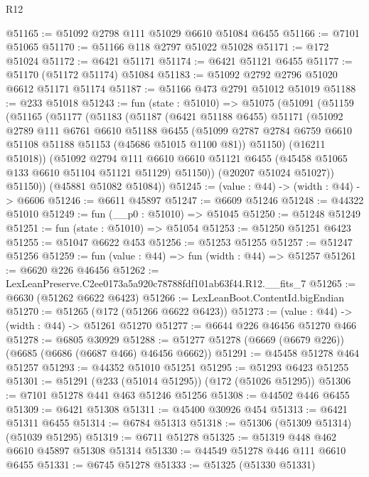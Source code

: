 \begin{lexlean}{R12}
\begin{coremodule}
@51165 := @51092 @2798 @111 @51029 @6610 @51084 @6455
@51166 := @7101 @51065
@51170 := @51166 @118 @2797 @51022 @51028
@51171 := @172 @51024
@51172 := @6421 @51171
@51174 := @6421 @51121 @6455
@51177 := @51170 (@51172 @51174) @51084
@51183 := @51092 @2792 @2796 @51020 @6612 @51171 @51174
@51187 := @51166 @473 @2791 @51012 @51019
@51188 := @233 @51018
@51243 := fun (state : @51010) =>
  @51075
    (@51091
      (@51159
        (@51165
          (@51177
            (@51183
              (@51187
                (@6421 @51188 @6455)
                @51171
                (@51092
                  @2789
                  @111
                  @6761
                  @6610
                  @51188
                  @6455
                  (@51099 @2787 @2784 @6759 @6610 @51108 @51188 @51153 (@45686 @51015 @1100 @81))
                  @51150)
                (@16211 @51018))
              (@51092
                @2794
                @111
                @6610
                @6610
                @51121
                @6455
                (@45458 @51065 @133 @6610 @51104 @51121 @51129)
                @51150))
            (@20207 @51024 @51027))
          @51150))
      (@45881 @51082 @51084))
@51245 := (value : @44) -> (width : @44) -> @6606
@51246 := @6611 @45897
@51247 := @6609 @51246
@51248 := @44322 @51010
@51249 := fun (__p0 : @51010) => @51045
@51250 := @51248 @51249
@51251 := fun (state : @51010) => @51054
@51253 := @51250 @51251 @6423
@51255 := @51047 @6622 @453
@51256 := @51253 @51255
@51257 := @51247 @51256
@51259 := fun (value : @44) => fun (width : @44) => @51257
@51261 := @6620 @226 @46456
@51262 := LexLeanPreserve.C2ee0173a5a920c78788fdf101ab63f44.R12.__fits_7
@51265 := @6630 (@51262 @6622 @6423)
@51266 := LexLeanBoot.ContentId.bigEndian
@51270 := @51265 (@172 (@51266 @6622 @6423))
@51273 := (value : @44) -> (width : @44) -> @51261 @51270
@51277 := @6644 @226 @46456 @51270 @466
@51278 := @6805 @30929
@51288 := @51277 @51278 (@6669 (@6679 @226)) (@6685 (@6686 (@6687 @466) @46456 @6662))
@51291 := @45458 @51278 @464 @51257
@51293 := @44352 @51010 @51251
@51295 := @51293 @6423 @51255
@51301 := @51291 (@233 (@51014 @51295)) (@172 (@51026 @51295))
@51306 := @7101 @51278 @441 @463 @51246 @51256
@51308 := @44502 @446 @6455
@51309 := @6421 @51308
@51311 := @45400 @30926 @454
@51313 := @6421 @51311 @6455
@51314 := @6784 @51313
@51318 := @51306 (@51309 @51314) (@51039 @51295)
@51319 := @6711 @51278
@51325 := @51319 @448 @462 @6610 @45897 @51308 @51314
@51330 := @44549 @51278 @446 @111 @6610 @6455
@51331 := @6745 @51278
@51333 := @51325 (@51330 @51331)

\end{coremodule}
\end{lexlean}
